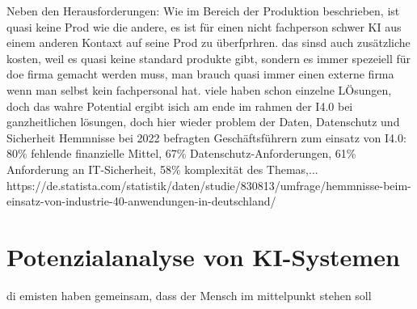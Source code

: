 \documentclass[a4paper,12pt, german]{report}
\begin{document}
Neben den Herausforderungen:
Wie im Bereich der Produktion beschrieben, ist quasi keine Prod wie die andere, es ist für einen nicht fachperson schwer KI aus einem anderen Kontaxt auf seine Prod zu überfprhren. das sinsd auch zusätzliche kosten, weil es quasi keine standard produkte gibt, sondern es immer spezeiell für doe firma gemacht werden muss, man brauch quasi immer einen externe firma wenn man selbst kein fachpersonal hat. 
viele haben schon einzelne LÖsungen, doch das wahre Potential ergibt isich am ende im rahmen der I4.0 bei ganzheitlichen lösungen, doch hier wieder problem der Daten, Datenschutz und Sicherheit
Hemmnisse bei 2022 befragten Geschäftsführern zum einsatz von I4.0: 80\% fehlende finanzielle Mittel, 67\% Datenschutz-Anforderungen, 61\% Anforderung an IT-Sicherheit, 58\% komplexität des Themas,... https://de.statista.com/statistik/daten/studie/830813/umfrage/hemmnisse-beim-einsatz-von-industrie-40-anwendungen-in-deutschland/






\section{Potenzialanalyse von KI-Systemen}
di emisten haben gemeinsam, dass der Mensch im mittelpunkt stehen soll




\end{document}

